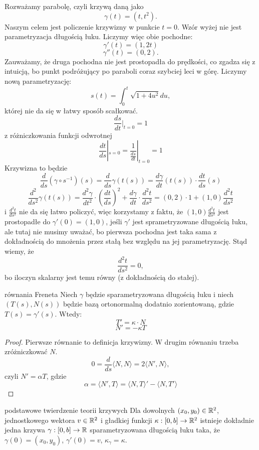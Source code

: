 \begin{example}
  Rozważamy parabolę, czyli krzywą daną jako
  $$\gamma(t)=(t, t^2).$$
  Naszym celem jest policzenie krzywizny w punkcie $t=0$. Wzór wyżej nie jest parametryzacja długością łuku. Liczymy więc obie pochodne:
  $$\gamma'(t)=(1, 2t)$$
  $$\gamma''(t)=(0, 2).$$
  Zauważamy, że druga pochodna nie jest prostopadła do prędkości, co zgadza się z intuicją, bo punkt podróżujący po paraboli coraz szybciej leci w górę. Liczymy nową parametryzację:
  $$s(t)=\int_0^t\sqrt{1+4u^2}du,$$
  której nie da się w łatwy sposób scałkować.
  $$\frac{ds}{dt}|_{t=0}=1$$
  z różniczkowania funkcji odwrotnej
  $$\frac{dt}{ds}|_{s=0}=\frac{1}{\frac{ds}{dt}}|_{t=0}=1$$
  Krzywizna to będzie 
  $$\frac{d}{ds}(\gamma\circ s^{-1})(s) =\frac{d}{ds}\gamma(t(s))=\frac{d\gamma}{dt}(t(s))\cdot\frac{dt}{ds}(s)$$
  $$\frac{d^2}{ds^2}\gamma(t(s))=\frac{d^2\gamma}{dt^2}\cdot\left(\frac{dt}{ds}\right)^2+\frac{d\gamma}{dt}\cdot\frac{d^2t}{ds^2}=(0,2)\cdot 1+(1,0)\frac{d^2t}{ds^2}$$
  i $\frac{d^2t}{ds^2}$ nie da się łatwo policzyć, więc korzystamy z faktu, że $(1,0)\frac{d^2t}{ds^2}$ jest prostopadłe do $\gamma'(0)=(1,0)$, jeśli $\gamma'$ jest sprametryzowane długością łuku, ale tutaj nie musimy uważać, bo pierwsza pochodna jest taka sama z dokładnością do mnożenia przez stałą bez względu na jej parametryzację. Stąd wiemy, że 
  $$\frac{d^2t}{ds^2}=0,$$
  bo iloczyn skalarny jest temu równy (z dokładnością do stałej).
\end{example}

\begin{lemma}{równania Freneta}{}
  Niech $\gamma$ będzie sparametryzowana długością łuku i niech $(T(s), N(s))$ będzie bazą ortonormalną dodatnio zorientowaną, gdzie $T(s)=\gamma'(s)$. Wtedy:
    $$T'=\kappa\cdot N$$
  $$N'=-\kappa T$$
\end{lemma}

\begin{proof}
  Pierwsze równanie to definicja krzywizny. W drugim równaniu trzeba zróżniczkować $N$.
  $$0=\frac{d}{ds}\langle N, N\rangle=2\langle N',N\rangle,$$
  czyli $N'=\alpha T$, gdzie 
  $$\alpha=\langle N', T\rangle=\langle N, T\rangle '-\langle N, T'\rangle$$
\end{proof}

\begin{theorem}{podstawowe twierdzenie teorii krzywych}{}
  Dla dowolnych $(x_0, y_0)\in \mathbb{R}^2$, jednostkowego wektora $v\in\mathbb{R}^2$ i gładkiej funkcji $\kappa:[0,b]\to \mathbb{R}^2$ istnieje dokładnie jedna krzywa $\gamma:[0,b]\to\mathbb{R}$ sparametryzowana długością łuku taka, że $\gamma(0)=(x_0, y_0)$, $\gamma'(0)=v$, $\kappa_\gamma=\kappa$.
\end{theorem}

